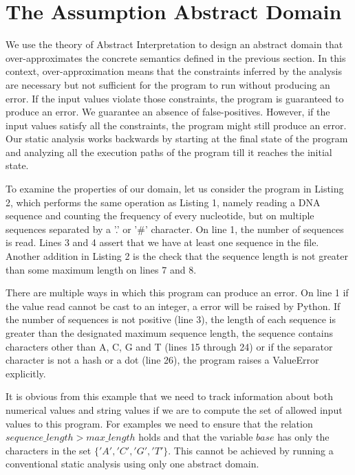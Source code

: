 \documentclass[10pt]{report}
\begin{document}
\section{The Assumption Abstract Domain} \label{assumption-domain}
We use the theory of Abstract Interpretation \cite{cousot} to design an abstract domain that over-approximates the concrete semantics defined in the previous section. In this context, over-approximation means that the constraints inferred by the analysis are necessary but not sufficient for the program to run without producing an error. If the input values violate those constraints, the program is guaranteed to produce an error. We guarantee an absence of false-positives. However, if the input values satisfy all the constraints, the program might still produce an error. Our static analysis works backwards by starting at the final state of the program and analyzing all the execution paths of the program till it reaches the initial state.  

To examine the properties of our domain, let us consider the program in Listing 2, which performs the same operation as Listing 1, namely reading a DNA sequence and counting the frequency of every nucleotide, but on multiple sequences separated by a '.' or '\#' character. On line 1, the number of sequences is read. Lines 3 and 4 assert that we have at least one sequence in the file. Another addition in Listing 2 is the check that the sequence length is not greater than some maximum length on lines 7 and 8. 

There are multiple ways in which this program can produce an error. On line 1 if the value read cannot be cast to an integer, a error will be raised by Python. If the number of sequences is not positive (line 3), the length of each sequence is greater than the designated maximum sequence length, the sequence contains characters other than A, C, G and T (lines 15 through 24) or if the separator character is not a hash or a dot (line 26), the program raises a ValueError explicitly. 

It is obvious from this example that we need to track information about both numerical values and string values if we are to compute the set of allowed input values to this program. For examples we need to ensure that the relation $sequence\_length > max\_length$ holds and that the variable $base$ has only the characters in the set $\lbrace'A', 'C', 'G', 'T' \rbrace$. This cannot be achieved by running a conventional static analysis using only one abstract domain.
\end{document}

